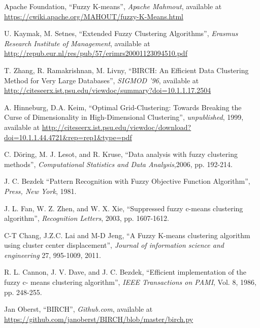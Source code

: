 \documentclass[conference, 10pt]{IEEEtran}
\begin{document}
\begin{thebibliography}{1}
 Apache Foundation, ``Fuzzy K-means'', \emph{Apache Mahmout}, available at
\url{https://cwiki.apache.org/MAHOUT/fuzzy-K-Means.html}

 U. Kaymak, M. Setnes, ``Extended Fuzzy Clustering Algorithms'', \emph{Erasmus Research Institute of Management}, available at
\url{http://repub.eur.nl/res/pub/57/erimrs20001123094510.pdf}

 T. Zhang, R. Ramakrishnan, M. Livny, ``BIRCH: An Efficient Data Clustering Method for Very Large Databases'', \emph{SIGMOD ’96}, available at
\url{http://citeseerx.ist.psu.edu/viewdoc/summary?doi=10.1.1.17.2504}

 A. Hinneburg, D.A. Keim, ``Optimal Grid-Clustering: Towards Breaking the Curse of Dimensionality in High-Dimensional Clustering'', \emph{unpublished}, 1999, available at
\url{http://citeseerx.ist.psu.edu/viewdoc/download?doi=10.1.1.44.4721&rep=rep1&type=pdf}  

                                             
 C. Döring, M. J. Lesot, and R. Kruse, ``Data analysis with fuzzy clustering methods'', \emph{Computational Statistics and Data Analysis},2006, pp. 192-214.

 J. C. Bezdek ``Pattern Recognition with Fuzzy Objective Function Algorithm'', \emph{Press, New York}, 1981.

 J. L. Fan, W. Z. Zhen, and W. X. Xie, ``Suppressed fuzzy c-means clustering algorithm'', \emph{ Recognition Letters}, 2003, pp. 1607-1612.

 C-T Chang, J.Z.C. Lai and M-D Jeng, ``A Fuzzy K-means clustering algorithm  using cluster center displacement'', \emph{Journal of information science and engineering} 27, 995-1009, 2011.

 R. L. Cannon, J. V. Dave, and J. C. Bezdek, ``Efficient implementation of the fuzzy c- means clustering algorithm'', \emph{IEEE Transactions on PAMI}, Vol. 8, 1986, pp. 248-255.

 Jan Oberst, ``BIRCH'', \emph{Github.com}, available at
\url{https://github.com/janoberst/BIRCH/blob/master/birch.py}

\end{thebibliography}

\end{document}

